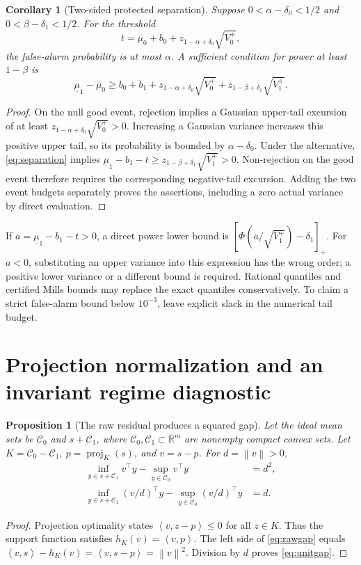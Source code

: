 \documentclass[11pt]{article}
\newtheorem{proposition}[theorem]{Proposition}
\newtheorem{corollary}[theorem]{Corollary}
\theoremstyle{remark}\newtheorem{remark}[theorem]{Remark}
\newcommand{\R}{\mathbb R}
\newcommand{\norm}[1]{\left\lVert#1\right\rVert}
\newcommand{\ip}[2]{\left\langle#1,#2\right\rangle}
\begin{document}
\begin{corollary}[Two-sided protected separation]\label{cor:gaussian}
Suppose $0<\alpha-\delta_0<1/2$ and $0<\beta-\delta_1<1/2$.
For the threshold
\begin{equation}\label{eq:threshold}
 t=\overline\mu_0+b_0+z_{1-\alpha+\delta_0}\sqrt{V_0^+},
\end{equation}
the false-alarm probability is at most $\alpha$. A sufficient condition for power at least $1-\beta$ is
\begin{equation}\label{eq:separation}
\boxed{\;
\underline\mu_1-\overline\mu_0
\ge b_0+b_1+
z_{1-\alpha+\delta_0}\sqrt{V_0^+}+
z_{1-\beta+\delta_1}\sqrt{V_1^+}.
\;}
\end{equation}
\end{corollary}
\begin{proof}
On the null good event, rejection implies a Gaussian upper-tail excursion of at least $z_{1-\alpha+\delta_0}\sqrt{V_0^+}>0$.
Increasing a Gaussian variance increases this positive upper tail, so its probability is bounded by $\alpha-\delta_0$. Under the alternative, \eqref{eq:separation} implies
$\underline\mu_1-b_1-t\ge z_{1-\beta+\delta_1}\sqrt{V_1^+}>0$.
Non-rejection on the good event therefore requires the corresponding negative-tail excursion. Adding the two event budgets separately proves the assertions, including a zero actual variance by direct evaluation.
\end{proof}

If $a=\underline\mu_1-b_1-t>0$, a direct power lower bound is
$[\Phi(a/\sqrt{V_1^+})-\delta_1]_+$. For $a<0$, substituting an upper variance into this expression has the wrong order; a positive lower variance or a different bound is required. Rational quantiles and certified Mills bounds may replace the exact quantiles conservatively. To claim a strict false-alarm bound below $10^{-3}$, leave explicit slack in the numerical tail budget.

\section{Projection normalization and an invariant regime diagnostic}
\begin{proposition}[The raw residual produces a squared gap]\label{prop:projection}
Let the ideal mean sets be $\mathcal C_0$ and $s+\mathcal C_1$, where
$\mathcal C_0,\mathcal C_1\subset\R^m$ are nonempty compact convex sets.
Let $K=\mathcal C_0-\mathcal C_1$, $p=\operatorname{proj}_K(s)$, and $v=s-p$. For $d=\norm v>0$,
\begin{align}
\inf_{y\in s+\mathcal C_1}v^\top y-
\sup_{y\in\mathcal C_0}v^\top y&=d^2,\label{eq:rawgap}\\
\inf_{y\in s+\mathcal C_1}(v/d)^\top y-
\sup_{y\in\mathcal C_0}(v/d)^\top y&=d.\label{eq:unitgap}
\end{align}
\end{proposition}
\begin{proof}
Projection optimality states $\ip{v}{z-p}\le0$ for all $z\in K$.
Thus the support function satisfies $h_K(v)=\ip vp$.
The left side of \eqref{eq:rawgap} equals
$\ip vs-h_K(v)=\ip v{s-p}=\norm v^2$.
Division by $d$ proves \eqref{eq:unitgap}.
\end{proof}
\end{document}
